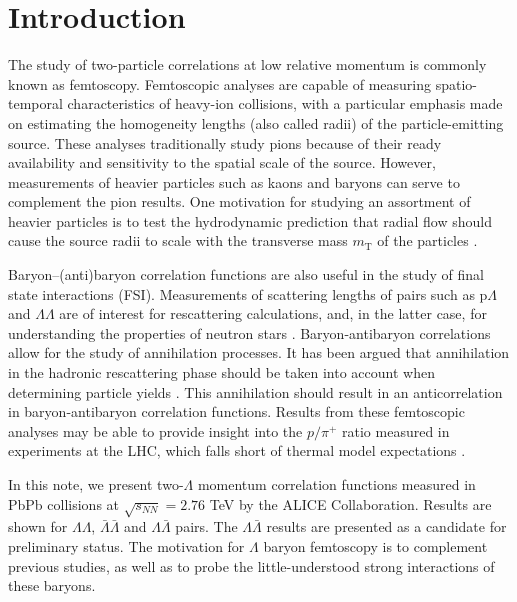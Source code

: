 %
\providecommand{\abs}[1]{\left\lvert#1\right\rvert}
\tableofcontents
\listoffigures
\pagebreak
\section{Introduction}

The study of two-particle correlations at low relative momentum is commonly known as femtoscopy.  Femtoscopic analyses are capable of measuring spatio-temporal characteristics of heavy-ion collisions, with a particular emphasis made on estimating the homogeneity lengths (also called radii) of the particle-emitting source.  These analyses traditionally study pions \cite{Goldhaber:1960sf,Aamodt:2011mr} because of their ready availability and sensitivity to the spatial scale of the source.  However, measurements of heavier particles such as kaons \cite{Abelev:2012ms} and baryons \cite{Gos:2007cj} can serve to complement the pion results.  One motivation for studying an assortment of heavier particles is to test the hydrodynamic prediction that radial flow should cause the source radii to scale with the transverse mass $m_{\mathrm{T}}$ of the particles \cite{Csorgo:1995bi,Lisa:2005dd}.

Baryon--(anti)baryon correlation functions are also useful in the study of final state interactions (FSI).  Measurements of scattering lengths of pairs such as p$\Lambda$ and $\Lambda\Lambda$ are of interest for rescattering calculations, and, in the latter case, for understanding the properties of neutron stars \cite{SchaffnerBielich:2008kb,Wang:2010gr}.  Baryon-antibaryon correlations allow for the study of annihilation processes.  It has been argued that annihilation in the hadronic rescattering phase should be taken into account when determining particle yields \cite{Werner:2012xh,Karpenko:2012yf,Steinheimer:2012rd}.  This annihilation should result in an anticorrelation in baryon-antibaryon correlation functions.  Results from these femtoscopic analyses may be able to provide insight into the $p/\pi^+$ ratio measured in experiments at the LHC, which falls short of thermal model expectations \cite{Preghenella:2012eu}. 

In this note, we present two-$\Lambda$ momentum correlation functions measured in PbPb collisions at $\sqrt{s_{NN}}=2.76$ TeV by the ALICE Collaboration.  Results are shown for $\Lambda\Lambda$, $\bar{\Lambda}\bar{\Lambda}$ and $\Lambda\bar{\Lambda}$ pairs. The $\Lambda\bar{\Lambda}$ results are presented as a candidate for preliminary status. The motivation for $\Lambda$ baryon femtoscopy is to complement previous studies, as well as to probe the little-understood strong interactions of these baryons.


